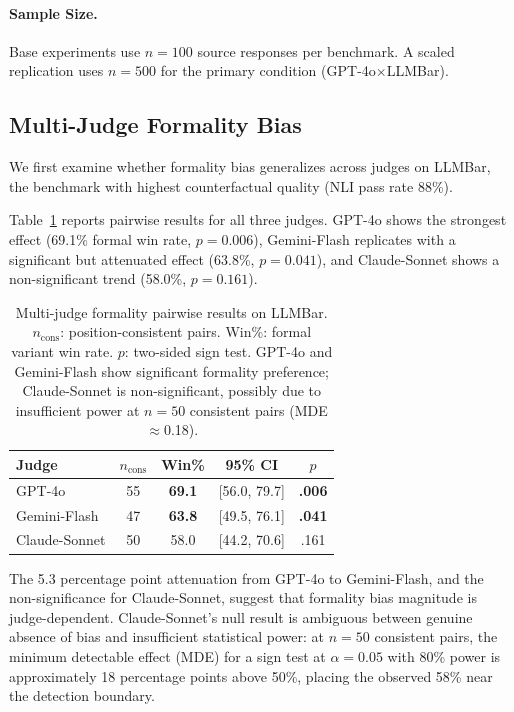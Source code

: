 \documentclass[11pt,a4paper]{article}
\newcommand{\sig}[1]{\textcolor{siggreen}{\textbf{#1}}}
\begin{document}
\paragraph{Sample Size.} Base experiments use $n{=}100$ source responses per benchmark.
A scaled replication uses $n{=}500$ for the primary condition (GPT-4o$\times$LLMBar).

\subsection{Multi-Judge Formality Bias}
\label{sec:exp_multijudge}

We first examine whether formality bias generalizes across judges on LLMBar, the benchmark with highest counterfactual quality (NLI pass rate 88\%).

Table~\ref{tab:multijudge} reports pairwise results for all three judges.
GPT-4o shows the strongest effect (69.1\% formal win rate, $p{=}0.006$), Gemini-Flash replicates with a significant but attenuated effect (63.8\%, $p{=}0.041$), and Claude-Sonnet shows a non-significant trend (58.0\%, $p{=}0.161$).

\begin{table}[t]
\centering
\small
\begin{tabular}{@{}lcccc@{}}
\toprule
\textbf{Judge} & $n_\text{cons}$ & \textbf{Win\%} & \textbf{95\% CI} & $p$ \\
\midrule
GPT-4o & 55 & \sig{69.1} & [56.0, 79.7] & \sig{.006} \\
Gemini-Flash & 47 & \sig{63.8} & [49.5, 76.1] & \sig{.041} \\
Claude-Sonnet & 50 & 58.0 & [44.2, 70.6] & .161 \\
\bottomrule
\end{tabular}
\caption{Multi-judge formality pairwise results on LLMBar. $n_\text{cons}$: position-consistent pairs. Win\%: formal variant win rate. $p$: two-sided sign test. GPT-4o and Gemini-Flash show significant formality preference; Claude-Sonnet is non-significant, possibly due to insufficient power at $n{=}50$ consistent pairs (MDE$\approx$0.18).}
\label{tab:multijudge}
\end{table}

The 5.3 percentage point attenuation from GPT-4o to Gemini-Flash, and the non-significance for Claude-Sonnet, suggest that formality bias magnitude is judge-dependent.
Claude-Sonnet's null result is ambiguous between genuine absence of bias and insufficient statistical power: at $n{=}50$ consistent pairs, the minimum detectable effect (MDE) for a sign test at $\alpha{=}0.05$ with 80\% power is approximately 18 percentage points above 50\%, placing the observed 58\% near the detection boundary.
\end{document}

